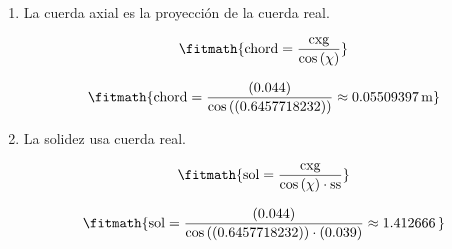 \begin{enumerate}

\item La cuerda axial es la proyección de la cuerda real.

\[\fitmath{\mathrm{chord}=\frac{\mathrm{cxg}}{\cos\left(\chi\right)}}\]

\[\fitmath{\mathrm{chord}=\frac{(0.044)}{\cos\left((0.6457718232)\right)}\approx 0.05509397\,\mathrm{m}}\]

\item La solidez usa cuerda real.

\[\fitmath{\mathrm{sol}=\frac{\mathrm{cxg}}{\cos\left(\chi\right)\cdot \mathrm{ss}}}\]

\[\fitmath{\mathrm{sol}=\frac{(0.044)}{\cos\left((0.6457718232)\right)\cdot (0.039)}\approx 1.412666\,}\]

\end{enumerate}
